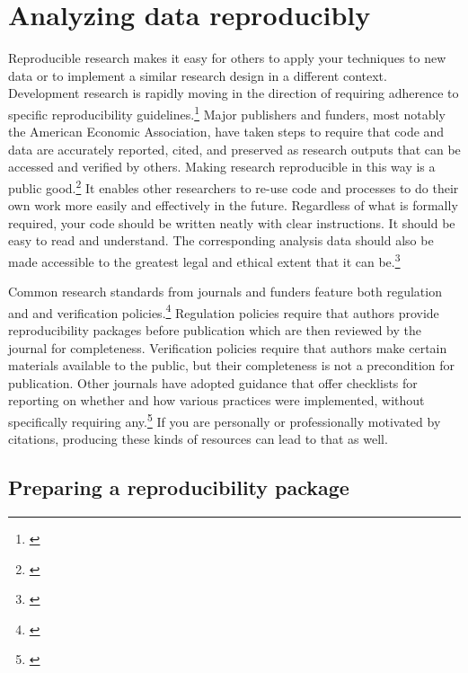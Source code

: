 \documentclass[]{tufte-book}
\begin{document}
\hypertarget{analyzing-data-reproducibly}{%
\section*{Analyzing data
reproducibly}\label{analyzing-data-reproducibly}}

Reproducible research makes it easy for others to apply your techniques
to new data or to implement a similar research design in a different
context. Development research is rapidly moving in the direction of
requiring adherence to specific reproducibility guidelines.\footnote{\cite{@christensen2018transparency}}
Major publishers and funders, most notably the American Economic
Association, have taken steps to require that code and data are
accurately reported, cited, and preserved as research outputs that can
be accessed and verified by others. Making research reproducible in this
way is a public good.\footnote{\href{https://dimewiki.worldbank.org/Reproducible_Research}{}}
It enables other researchers to re-use code and processes to do their
own work more easily and effectively in the future. Regardless of what
is formally required, your code should be written neatly with clear
instructions. It should be easy to read and understand. The
corresponding analysis data should also be made accessible to the
greatest legal and ethical extent that it can be.\footnote{\href{https://dimewiki.worldbank.org/Publishing_Data}{}}

Common research standards from journals and funders feature both
regulation and and verification policies.\footnote{\cite{@stodden2013toward}}
Regulation policies require that authors provide reproducibility
packages before publication which are then reviewed by the journal for
completeness. Verification policies require that authors make certain
materials available to the public, but their completeness is not a
precondition for publication. Other journals have adopted guidance that
offer checklists for reporting on whether and how various practices were
implemented, without specifically requiring any.\footnote{\cite{@nosek2015promoting}}
If you are personally or professionally motivated by citations,
producing these kinds of resources can lead to that as well.

\hypertarget{preparing-a-reproducibility-package}{%
\subsection*{Preparing a reproducibility
package}\label{preparing-a-reproducibility-package}}
\end{document}
